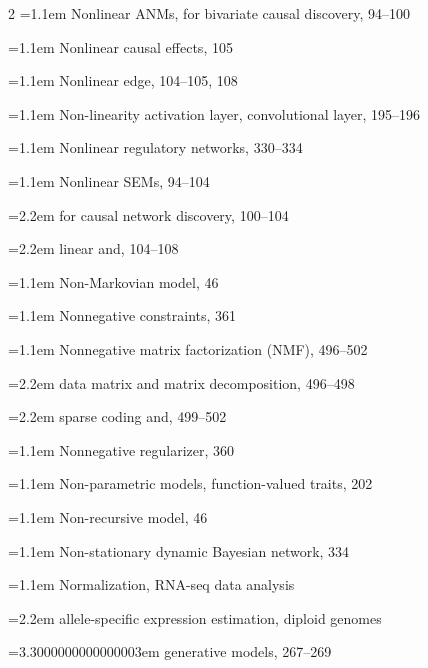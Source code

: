 \begin{multicols}{2}
\noindent\hangindent=1.1em Nonlinear ANMs, for bivariate causal discovery, 94--100\par
\noindent\hangindent=1.1em Nonlinear causal effects, 105\par
\noindent\hangindent=1.1em Nonlinear edge, 104--105, 108\par
\noindent\hangindent=1.1em Non-linearity activation layer, convolutional layer, 195--196\par
\noindent\hangindent=1.1em Nonlinear regulatory networks, 330--334\par
\noindent\hangindent=1.1em Nonlinear SEMs, 94--104\par
\noindent\hangindent=2.2em \hspace*{1.1em}for causal network discovery, 100--104\par
\noindent\hangindent=2.2em \hspace*{1.1em}linear and, 104--108\par
\noindent\hangindent=1.1em Non-Markovian model, 46\par
\noindent\hangindent=1.1em Nonnegative constraints, 361\par
\noindent\hangindent=1.1em Nonnegative matrix factorization (NMF), 496--502\par
\noindent\hangindent=2.2em \hspace*{1.1em}data matrix and matrix decomposition, 496--498\par
\noindent\hangindent=2.2em \hspace*{1.1em}sparse coding and, 499--502\par
\noindent\hangindent=1.1em Nonnegative regularizer, 360\par
\noindent\hangindent=1.1em Non-parametric models, function-valued traits, 202\par
\noindent\hangindent=1.1em Non-recursive model, 46\par
\noindent\hangindent=1.1em Non-stationary dynamic Bayesian network, 334\par
\noindent\hangindent=1.1em Normalization, RNA-seq data analysis\par
\noindent\hangindent=2.2em \hspace*{1.1em}allele-specific expression estimation, diploid genomes\par
\noindent\hangindent=3.3000000000000003em \hspace*{2.2em}generative models, 267--269\par

\end{multicols}
